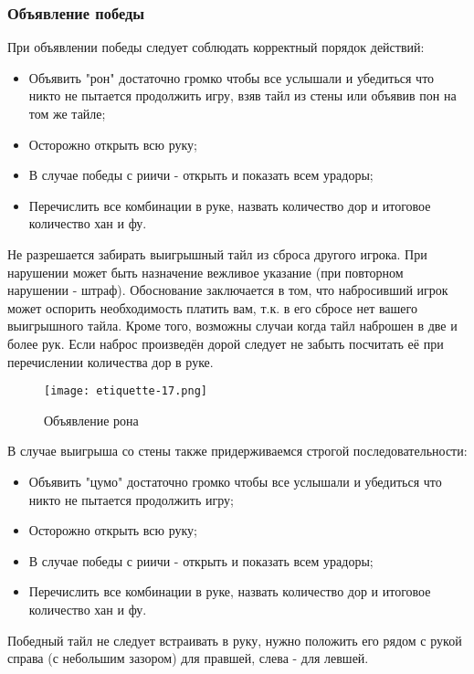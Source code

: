 \subsubsection{Объявление победы}

При объявлении победы следует соблюдать корректный порядок действий:

\begin{itemize}
	\item Объявить "рон" достаточно громко чтобы все услышали и убедиться что никто не пытается продолжить игру, взяв тайл из стены или объявив пон на том же тайле;
	\item Осторожно открыть всю руку;
	\item В случае победы с риичи - открыть и показать всем урадоры;
	\item Перечислить все комбинации в руке, назвать количество дор и итоговое количество хан и фу.
\end{itemize}

Не разрешается забирать выигрышный тайл из сброса другого игрока. При нарушении может быть назначение вежливое указание (при повторном нарушении - штраф). Обоснование заключается в том, что набросивший игрок может оспорить необходимость платить вам, т.к. в его сбросе нет вашего выигрышного тайла. Кроме того, возможны случаи когда тайл наброшен в две и более рук. Если наброс произведён дорой следует не забыть посчитать её при перечислении количества дор в руке.

\begin{figure}[H]
	\centering
	\texttt{[image: etiquette-17.png]}
	\caption{Объявление рона}
\end{figure}

В случае выигрыша со стены также придерживаемся строгой последовательности:

\begin{itemize}
	\item Объявить "цумо" достаточно громко чтобы все услышали и убедиться что никто не пытается продолжить игру;
	\item Осторожно открыть всю руку;
	\item В случае победы с риичи - открыть и показать всем урадоры;
	\item Перечислить все комбинации в руке, назвать количество дор и итоговое количество хан и фу.
\end{itemize}

Победный тайл не следует встраивать в руку, нужно положить его рядом с рукой справа (с небольшим зазором) для правшей, слева - для левшей. 

